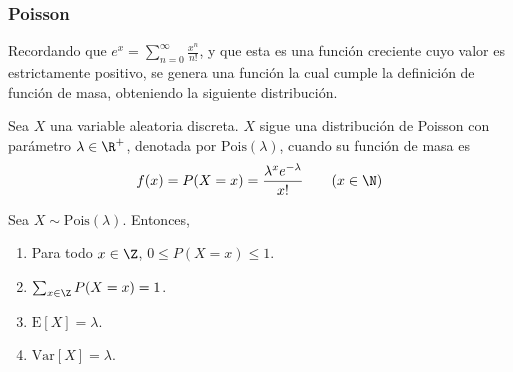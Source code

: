 \subsubsection{Poisson}
Recordando que $e^x=\sum_{n=0}^\infty\frac{x^n}{n!}$, y que esta es una función
creciente cuyo valor es estrictamente positivo, se genera una función la cual
cumple la definición de función de masa, obteniendo la siguiente distribución.
\begin{Def}
  Sea $X$ una variable aleatoria discreta. $X$ sigue una distribución
  de Poisson con parámetro $\lambda\in\R^+$, denotada por $\text{Pois}(\lambda)$,
  cuando su función de masa es
  \[f(x) = P(X=x) = \frac{\lambda^xe^{-\lambda}}{x!} \qquad (x\in\N)\]
\end{Def}
\begin{Teo}
  Sea $X\sim\text{Pois}(\lambda)$. Entonces,
  \begin{enumerate}
    \item Para todo $x\in\Z$, $0\leq P(X=x)\leq1$.
    \item $\sum_{x\in\Z}P(X=x)=1$.
    \item $\text{E}[X] = \lambda$.
    \item $\text{Var}[X]=\lambda$.
  \end{enumerate}
\end{Teo}
